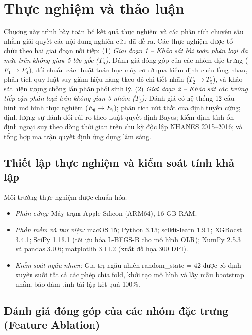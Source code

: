 \chapter{Thực nghiệm và thảo luận}
\label{ch:thuc-nghiem}

Chương này trình bày toàn bộ kết quả thực nghiệm và các phân tích chuyên sâu nhằm giải quyết các nội dung nghiên cứu đã đề ra. Các thực nghiệm được tổ chức theo hai giai đoạn nối tiếp:
(1) \textit{Giai đoạn 1 -- Khảo sát bài toán phân loại đa mức trên không gian 5 lớp gốc ($T_5$):} Đánh giá đóng góp của các nhóm đặc trưng ($F_1 \to F_4$), đối chuẩn các thuật toán học máy cơ sở qua kiểm định chéo lồng nhau, phân tích quy luật suy giảm hiệu năng theo độ chi tiết nhãn ($T_2 \to T_5$), và khảo sát hiện tượng chồng lấn phân phối sinh lý.
(2) \textit{Giai đoạn 2 -- Khảo sát các hướng tiếp cận phân loại trên không gian 3 nhóm ($T_3$):} Đánh giá có hệ thống 12 cấu hình mô hình thực nghiệm ($E_0 \to E_7$); phân tích nút thắt của định tuyến cứng; định lượng sự đánh đổi rủi ro theo Luật quyết định Bayes; kiểm định tính ổn định ngoại suy theo dòng thời gian trên chu kỳ độc lập NHANES 2015--2016; và tổng hợp ma trận quyết định ứng dụng lâm sàng.

\section{Thiết lập thực nghiệm và kiểm soát tính khả lập}
\label{sec:moi-truong-thuc-nghiem}

Môi trường thực nghiệm được chuẩn hóa:
\begin{itemize}
    \item \textit{Phần cứng:} Máy trạm Apple Silicon (ARM64), 16 GB RAM.
    \item \textit{Phần mềm và thư viện:} macOS 15; Python 3.13; scikit-learn 1.9.1; XGBoost 3.4.1; SciPy 1.18.1 (tối ưu hóa L-BFGS-B cho mô hình OLR); NumPy 2.5.3 và pandas 3.0.6; matplotlib 3.11.2 (xuất đồ họa 300 DPI).
    \item \textit{Kiểm soát ngẫu nhiên:} Giá trị ngẫu nhiên \textnormal{random\_state = 42} được cố định xuyên suốt tất cả các phép chia fold, khởi tạo mô hình và lấy mẫu bootstrap nhằm bảo đảm tính tái lập kết quả 100\%.
\end{itemize}

\section{Đánh giá đóng góp của các nhóm đặc trưng (Feature Ablation)}
\label{sec:feature-ablation}

